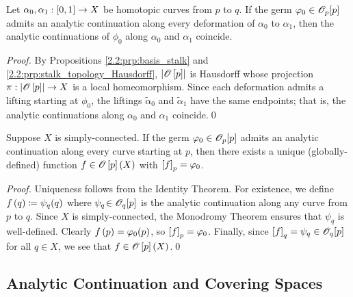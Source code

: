 \documentclass[../Moduli_Spaces_of_Riemann_Surfaces.tex]{subfiles}
\begin{document}
    \begin{corollary}
        Let $\alpha_0,\alpha_1:\left[0,1\right]\to X$ be homotopic curves from $p$ to $q$. If the germ $\varphi_0\in\mathscr{O}_p\!\left[p\right]$ admits an analytic continuation along every deformation of $\alpha_0$ to $\alpha_1$, then the analytic continuations of $\phi_0$ along $\alpha_0$ and $\alpha_1$ coincide.
    \end{corollary}
    \begin{proof}
        By Propositions \ref{2.2:prp:basis_stalk} and \ref{2.2:prp:stalk_topology_Hausdorff}, $\left|\mathscr{O}\left[p\right]\right|$ is Hausdorff whose projection $\pi:\left|\mathscr{O}\left[p\right]\right|\to X$ is a local homeomorphism. Since each deformation admits a lifting starting at $\phi_0$, the liftings $\tilde{\alpha}_0$ and $\tilde{\alpha}_1$ have the same endpoints; that is, the analytic continuations along $\alpha_0$ and $\alpha_1$ coincide.\qed
    \end{proof}
    \begin{corollary}
        Suppose $X$ is simply-connected. If the germ $\varphi_0\in\mathscr{O}_p\!\left[p\right]$ admits an analytic continuation along every curve starting at $p$, then there exists a unique (globally-defined) function $f\in\mathscr{O}\left[p\right]\left(X\right)$ with $\left[f\right]_p=\varphi_0$.
    \end{corollary}
    \begin{proof}
        Uniqueness follows from the Identity Theorem. For existence, we define $f\left(q\right)\coloneqq\psi_q\!\left(q\right)$ where $\psi_q\!\in\mathscr{O}_q\!\left[p\right]$ is the analytic continuation along any curve from $p$ to $q$. Since $X$ is simply-connected, the Monodromy Theorem ensures that $\psi_q$ is well-defined. Clearly $f\left(p\right)=\varphi_0\!\left(p\right)$, so $\left[f\right]_p=\varphi_0$. Finally, since $\left[f\right]_q=\psi_q\in\mathscr{O}_q\!\left[p\right]$ for all $q\in X$, we see that $f\in\mathscr{O}\left[p\right]\left(X\right)$.\qed
    \end{proof}
    \subsection{Analytic Continuation and Covering Spaces}
\end{document}
